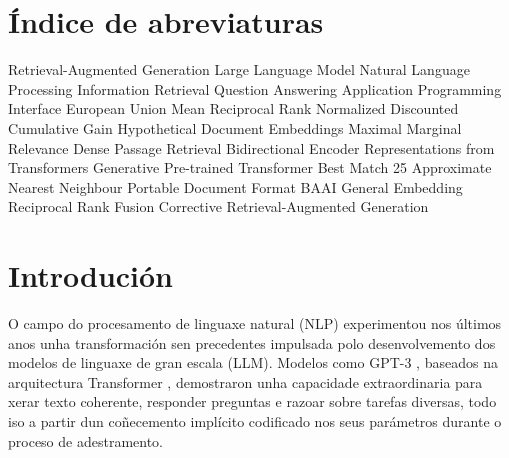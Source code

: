 \documentclass[11pt, a4paper, oneside]{report}
\begin{document}
\chapter*{Índice de abreviaturas}

\begin{acronym}[NDCG]
    {Retrieval-Augmented Generation}
    {Large Language Model}
    {Natural Language Processing}
     {Information Retrieval}
     {Question Answering}
    {Application Programming Interface}
     {European Union}
    {Mean Reciprocal Rank}
   {Normalized Discounted Cumulative Gain}
   {Hypothetical Document Embeddings}
    {Maximal Marginal Relevance}
    {Dense Passage Retrieval}
   {Bidirectional Encoder Representations from Transformers}
    {Generative Pre-trained Transformer}
   {Best Match 25}
    {Approximate Nearest Neighbour}
    {Portable Document Format}
    {BAAI General Embedding}
    {Reciprocal Rank Fusion}
   {Corrective Retrieval-Augmented Generation}
\end{acronym}

\clearpage

\listoftables
\listoffigures
\clearpage


\chapter*{Introdución}

O campo do procesamento de linguaxe natural (\ac{NLP}) experimentou nos últimos anos
unha transformación sen precedentes impulsada polo desenvolvemento dos modelos de
linguaxe de gran escala (\ac{LLM}). Modelos como GPT-3 \citep{brown2020language},
baseados na arquitectura Transformer \citep{vaswani2017attention}, demostraron unha
capacidade extraordinaria para xerar texto coherente, responder preguntas e razoar sobre
tarefas diversas, todo iso a partir dun coñecemento implícito codificado nos seus
parámetros durante o proceso de adestramento.
\end{document}
